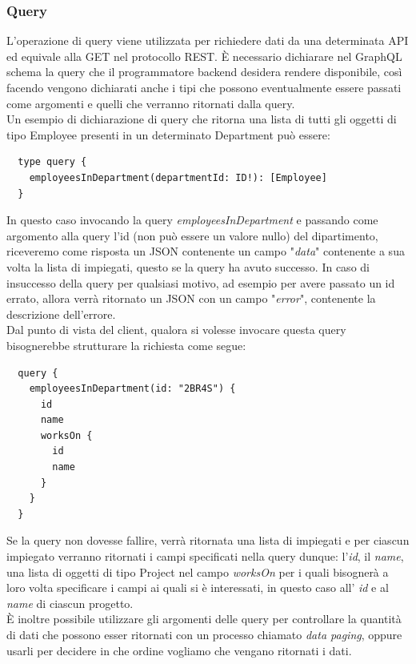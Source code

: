 \subsubsection{Query}
L'operazione di query viene utilizzata per richiedere dati da una determinata API ed equivale alla GET nel protocollo REST. È necessario dichiarare nel GraphQL schema la query che il programmatore backend desidera rendere disponibile, così facendo vengono dichiarati anche i tipi che possono eventualmente essere passati come argomenti e quelli che verranno ritornati dalla query.\\
Un esempio di dichiarazione di query che ritorna una lista di tutti gli oggetti di tipo Employee presenti in un determinato Department può essere:
\begin{verbatim}
  type query {
    employeesInDepartment(departmentId: ID!): [Employee]
  }
\end{verbatim}
In questo caso invocando la query \textit{employeesInDepartment} e passando come argomento alla query l'id (non può essere un valore nullo) del dipartimento, riceveremo come risposta un JSON contenente un campo "\textit{data}" contenente a sua volta la lista di impiegati, questo se la query ha avuto successo. In caso di insuccesso della query per qualsiasi motivo, ad esempio per avere passato un id errato, allora verrà ritornato un JSON con un campo "\textit{error}", contenente la descrizione dell'errore. \\
Dal punto di vista del client, qualora si volesse invocare questa query bisognerebbe strutturare la richiesta come segue:
\begin{verbatim}
  query {
    employeesInDepartment(id: "2BR4S") {
      id
      name
      worksOn {
        id
        name
      }
    }
  }
\end{verbatim}
Se la query non dovesse fallire, verrà ritornata una lista di impiegati e per ciascun impiegato verranno ritornati i campi specificati nella query dunque: l'\textit{id}, il \textit{name}, una lista di oggetti di tipo Project nel campo \textit{worksOn} per i quali bisognerà a loro volta specificare i campi ai quali si è interessati, in questo caso all' \textit{id} e al \textit{name} di ciascun progetto.\\
È inoltre possibile utilizzare gli argomenti delle query per controllare la quantità di dati che possono esser ritornati con un processo chiamato \textit{data paging}, oppure usarli per decidere in che ordine vogliamo che vengano ritornati i dati.
